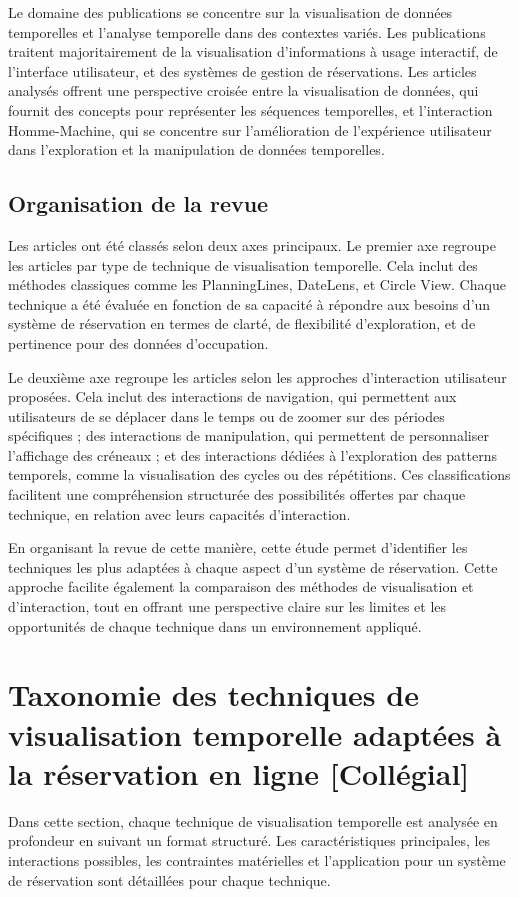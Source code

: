 \documentclass[runningheads]{llncs}
\begin{document}
Le domaine des publications se concentre sur la visualisation de données temporelles et l’analyse temporelle dans des contextes variés. Les publications traitent majoritairement de la visualisation d’informations à usage interactif, de l’interface utilisateur, et des systèmes de gestion de réservations. Les articles analysés offrent une perspective croisée entre la visualisation de données, qui fournit des concepts pour représenter les séquences temporelles, et l’interaction Homme-Machine, qui se concentre sur l’amélioration de l’expérience utilisateur dans l’exploration et la manipulation de données temporelles.

\subsection{Organisation de la revue}
Les articles ont été classés selon deux axes principaux. Le premier axe regroupe les articles par type de technique de visualisation temporelle. Cela inclut des méthodes classiques comme les PlanningLines, DateLens, et Circle View. Chaque technique a été évaluée en fonction de sa capacité à répondre aux besoins d’un système de réservation en termes de clarté, de flexibilité d’exploration, et de pertinence pour des données d’occupation.

Le deuxième axe regroupe les articles selon les approches d’interaction utilisateur proposées. Cela inclut des interactions de navigation, qui permettent aux utilisateurs de se déplacer dans le temps ou de zoomer sur des périodes spécifiques ; des interactions de manipulation, qui permettent de personnaliser l’affichage des créneaux ; et des interactions dédiées à l'exploration des patterns temporels, comme la visualisation des cycles ou des répétitions. Ces classifications facilitent une compréhension structurée des possibilités offertes par chaque technique, en relation avec leurs capacités d’interaction.

En organisant la revue de cette manière, cette étude permet d’identifier les techniques les plus adaptées à chaque aspect d’un système de réservation. Cette approche facilite également la comparaison des méthodes de visualisation et d'interaction, tout en offrant une perspective claire sur les limites et les opportunités de chaque technique dans un environnement appliqué.

\section{Taxonomie des techniques de visualisation temporelle adaptées à la réservation en ligne [Collégial]}
Dans cette section, chaque technique de visualisation temporelle est analysée en profondeur en suivant un format structuré. Les caractéristiques principales, les interactions possibles, les contraintes matérielles et l’application pour un système de réservation sont détaillées pour chaque technique.
\end{document}

